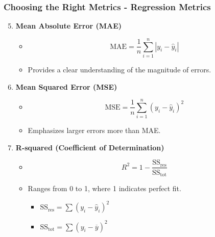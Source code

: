 \documentclass[aspectratio=169]{beamer}
\begin{document}
\begin{frame}[fragile]
    \frametitle{Choosing the Right Metrics - Regression Metrics}
    \begin{enumerate}
        \setcounter{enumi}{4}
        \item \textbf{Mean Absolute Error (MAE)}
        \begin{itemize}
            \item \[ \text{MAE} = \frac{1}{n} \sum_{i=1}^{n} |y_i - \hat{y}_i| \]
            \item Provides a clear understanding of the magnitude of errors.
        \end{itemize}
        \item \textbf{Mean Squared Error (MSE)}
        \begin{itemize}
            \item \[ \text{MSE} = \frac{1}{n} \sum_{i=1}^{n} (y_i - \hat{y}_i)^2 \]
            \item Emphasizes larger errors more than MAE.
        \end{itemize}
        \item \textbf{R-squared (Coefficient of Determination)}
        \begin{itemize}
            \item \[ R^2 = 1 - \frac{\text{SS}_{\text{res}}}{\text{SS}_{\text{tot}}} \]
            \item Ranges from 0 to 1, where 1 indicates perfect fit.
            \begin{itemize}
                \item \(\text{SS}_{\text{res}} = \sum (y_i - \hat{y}_i)^2\)
                \item \(\text{SS}_{\text{tot}} = \sum (y_i - \overline{y})^2\)
            \end{itemize}
        \end{itemize}
    \end{enumerate}
\end{frame}
\end{document}
